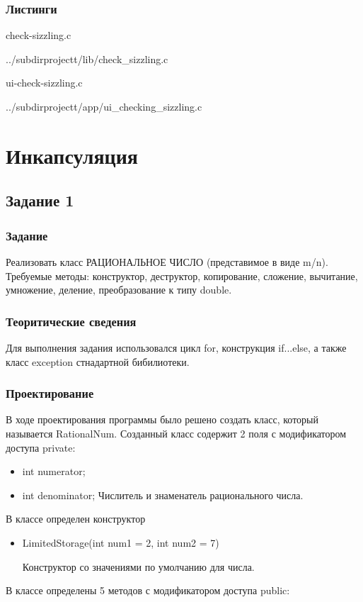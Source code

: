 \documentclass[12pt,a4paper]{report}
\begin{document}
\subsection*{Листинги}
check-sizzling.c

{../subdirprojectt/lib/check_sizzling.c}

\vspace{\baselineskip}

ui-check-sizzling.c

{../subdirprojectt/app/ui_checking_sizzling.c}


\chapter{Инкапсуляция}
\section{Задание 1}
\subsection{Задание}

Реализовать класс РАЦИОНАЛЬНОЕ ЧИСЛО (представимое в виде m/n). Требуемые методы: конструктор, деструктор, копирование, сложение, вычитание, умножение, деление, преобразование к типу double.

\subsection{Теоритические сведения}

Для выполнения задания использовался цикл for, конструкция if...else, а также класс exception стнадартной бибилиотеки.

\subsection{Проектирование}


В ходе проектирования программы было решено создать класс, который называется RationalNum.
Созданный класс содержит 2 поля с модификатором доступа private:

\begin{itemize}
	\item  int numerator;
    \item  int denominator;
    Числитель и знаменатель рационального числа.
\end{itemize}
	
	В классе определен конструктор
\begin{itemize}

	\item LimitedStorage(int num1 = 2, int num2 = 7)
	
	Конструктор со значениями по умолчанию для числа. 
	
			
\end{itemize}	
В классе определены 5 методов с модификатором доступа public:		
\end{document}
